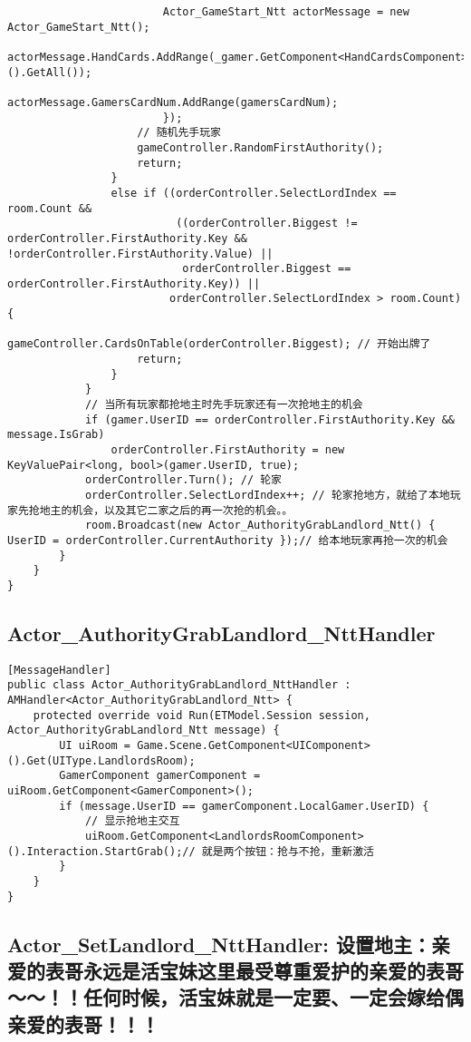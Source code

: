 \documentclass[9pt, b5paper]{article}
\begin{document}
\begin{verbatim}
                        Actor_GameStart_Ntt actorMessage = new Actor_GameStart_Ntt();
                        actorMessage.HandCards.AddRange(_gamer.GetComponent<HandCardsComponent>().GetAll());
                        actorMessage.GamersCardNum.AddRange(gamersCardNum);
                        });
                    // 随机先手玩家
                    gameController.RandomFirstAuthority();
                    return;
                }
                else if ((orderController.SelectLordIndex == room.Count &&
                          ((orderController.Biggest != orderController.FirstAuthority.Key && !orderController.FirstAuthority.Value) ||
                           orderController.Biggest == orderController.FirstAuthority.Key)) ||
                         orderController.SelectLordIndex > room.Count) {
                    gameController.CardsOnTable(orderController.Biggest); // 开始出牌了
                    return;
                }
            }
            // 当所有玩家都抢地主时先手玩家还有一次抢地主的机会
            if (gamer.UserID == orderController.FirstAuthority.Key && message.IsGrab) 
                orderController.FirstAuthority = new KeyValuePair<long, bool>(gamer.UserID, true);
            orderController.Turn(); // 轮家
            orderController.SelectLordIndex++; // 轮家抢地方，就给了本地玩家先抢地主的机会，以及其它二家之后的再一次抢的机会。。
            room.Broadcast(new Actor_AuthorityGrabLandlord_Ntt() { UserID = orderController.CurrentAuthority });// 给本地玩家再抢一次的机会
        }
    }
}
\end{verbatim}
\subsection{Actor\_AuthorityGrabLandlord\_NttHandler}
\label{sec-3-2}
\begin{verbatim}
[MessageHandler]
public class Actor_AuthorityGrabLandlord_NttHandler : AMHandler<Actor_AuthorityGrabLandlord_Ntt> {
    protected override void Run(ETModel.Session session, Actor_AuthorityGrabLandlord_Ntt message) {
        UI uiRoom = Game.Scene.GetComponent<UIComponent>().Get(UIType.LandlordsRoom);
        GamerComponent gamerComponent = uiRoom.GetComponent<GamerComponent>();
        if (message.UserID == gamerComponent.LocalGamer.UserID) {
            // 显示抢地主交互
            uiRoom.GetComponent<LandlordsRoomComponent>().Interaction.StartGrab();// 就是两个按钮：抢与不抢，重新激活
        }
    }
}
\end{verbatim}
\subsection{Actor\_SetLandlord\_NttHandler: 设置地主：亲爱的表哥永远是活宝妹这里最受尊重爱护的亲爱的表哥～～！！任何时候，活宝妹就是一定要、一定会嫁给偶亲爱的表哥！！！}
\label{sec-3-3}
\end{document}
